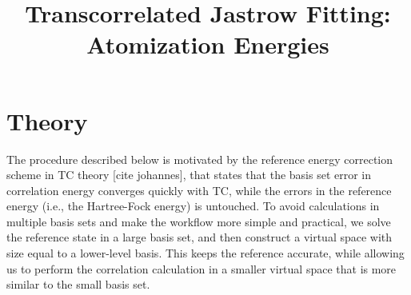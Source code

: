 \documentclass[12pt]{article}
\title{Transcorrelated Jastrow Fitting: Atomization Energies}
\author{}
\date{}
\begin{document}
\maketitle

\section{Theory}

The procedure described below is motivated by the reference energy correction scheme in TC theory [cite johannes], that states that the basis set error in correlation energy converges quickly with TC, while the errors in the reference energy (i.e., the Hartree-Fock energy) is untouched.  To avoid calculations in multiple basis sets and make the workflow more simple and practical, we solve the reference state in a large basis set, and then construct a virtual space with size equal to a lower-level basis. This keeps the reference accurate, while allowing us to perform the correlation calculation in a smaller virtual space that is more similar to the small basis set. 
\end{document}
